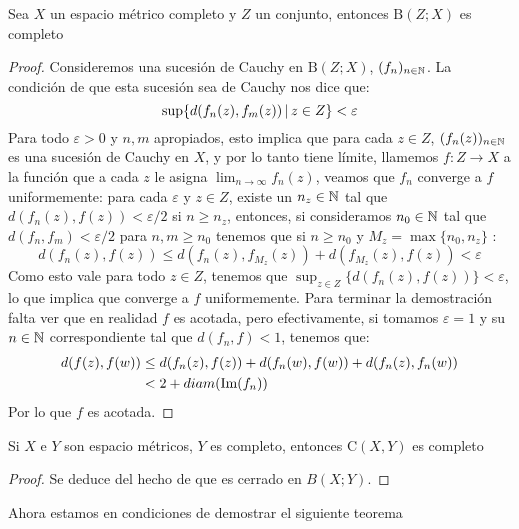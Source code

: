 \documentclass[12pt,a4paper]{book}
\begin{document}
\begin{prop}
Sea $X$ un espacio métrico completo y $Z$ un conjunto, entonces $\mathrm{B}(Z;X)$ es completo
\begin{proof}
Consideremos una sucesión de Cauchy en $\mathrm{B}(Z;X)$, $(f_n)_{{n} \in \mathbb{N}}$. La condición de que esta sucesión sea de Cauchy nos dice que:
$$\sup \{ d(f_n(z),f_m(z)) \,\vert\, z \in Z \} < \varepsilon$$
Para todo $\varepsilon >0$ y $n,m$ apropiados, esto implica que para cada $z \in Z$, $(f_n(z))_{{n} \in \mathbb{N}}$ es una sucesión de Cauchy en $X$, y por lo tanto tiene límite, llamemos $f:Z \rightarrow X$ a la función que a cada $z$ le asigna $\displaystyle \lim_{n \to \infty} f_n(z)$, veamos que $f_n$ converge a $f$ uniformemente: para cada $\varepsilon$ y $z \in Z$, existe un $n_z \in \mathbb{N}$ tal que $d(f_n(z),f(z))<\varepsilon/2$ si $n \geq n_z$, entonces, si consideramos $n_0 \in \mathbb{N}$ tal que $d(f_n,f_m)<\varepsilon/2$ para $n,m \geq n_0$ tenemos que si $n \geq n_0$ y $M_z = \max\{ n_0, n_z\}$ : 
$$d(f_n(z),f(z)) \leq d(f_n(z),f_{M_z}(z)) + d(f_{M_z}(z),f(z))< \varepsilon$$
Como esto vale para todo $z \in Z$, tenemos que $\sup_{z \in Z}\{d(f_n(z),f(z))\}<\varepsilon$, lo que implica que converge a $f$ uniformemente. Para terminar la demostración falta ver que en realidad $f$ es acotada, pero efectivamente, si tomamos $\varepsilon = 1$ y su $n \in \mathbb{N}$ correspondiente tal que $d(f_n,f)<1$,  tenemos que:
\begin{align*}
d(f(z),f(w)) &\leq d(f_n(z),f(z)) + d(f_n(w),f(w)) + d(f_n(z),f_n(w)) \\
&< 2 + diam(\mbox{Im}(f_n))
\end{align*} 
Por lo que $f$ es acotada.
\end{proof}
\end{prop}
\begin{cor}
Si $X$ e $Y$ son espacio métricos, $Y$ es completo, entonces $\mathrm{C}(X,Y)$ es completo
\begin{proof}
Se deduce del hecho de que es cerrado en $B(X;Y)$.
\end{proof}
\end{cor}
Ahora estamos en condiciones de demostrar el siguiente teorema
\end{document}

